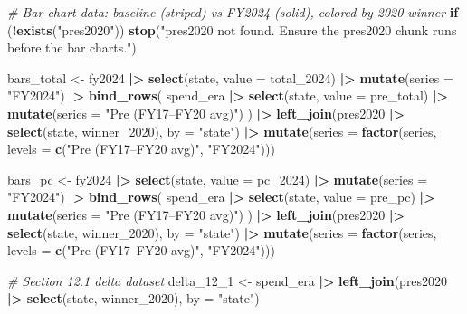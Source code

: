 \documentclass[
  11pt,
]{article}
\newenvironment{Shaded}{\begin{snugshade}}{\end{snugshade}}
\newcommand{\AttributeTok}[1]{\textcolor[rgb]{0.13,0.29,0.53}{#1}}
\newcommand{\CommentTok}[1]{\textcolor[rgb]{0.56,0.35,0.01}{\textit{#1}}}
\newcommand{\ControlFlowTok}[1]{\textcolor[rgb]{0.13,0.29,0.53}{\textbf{#1}}}
\newcommand{\FunctionTok}[1]{\textcolor[rgb]{0.13,0.29,0.53}{\textbf{#1}}}
\newcommand{\NormalTok}[1]{#1}
\newcommand{\OtherTok}[1]{\textcolor[rgb]{0.56,0.35,0.01}{#1}}
\newcommand{\SpecialCharTok}[1]{\textcolor[rgb]{0.81,0.36,0.00}{\textbf{#1}}}
\newcommand{\StringTok}[1]{\textcolor[rgb]{0.31,0.60,0.02}{#1}}
\begin{document}
\begin{Shaded}
\begin{Highlighting}[]
\CommentTok{\# Bar chart data: baseline (striped) vs FY2024 (solid), colored by 2020 winner}
\ControlFlowTok{if}\NormalTok{ (}\SpecialCharTok{!}\FunctionTok{exists}\NormalTok{(}\StringTok{"pres2020"}\NormalTok{)) }\FunctionTok{stop}\NormalTok{(}\StringTok{"pres2020 not found. Ensure the pres2020 chunk runs before the bar charts."}\NormalTok{)}

\NormalTok{bars\_total }\OtherTok{\textless{}{-}}\NormalTok{ fy2024 }\SpecialCharTok{|\textgreater{}}
  \FunctionTok{select}\NormalTok{(state, }\AttributeTok{value =}\NormalTok{ total\_2024) }\SpecialCharTok{|\textgreater{}}
  \FunctionTok{mutate}\NormalTok{(}\AttributeTok{series =} \StringTok{"FY2024"}\NormalTok{) }\SpecialCharTok{|\textgreater{}}
  \FunctionTok{bind\_rows}\NormalTok{(}
\NormalTok{    spend\_era }\SpecialCharTok{|\textgreater{}}
      \FunctionTok{select}\NormalTok{(state, }\AttributeTok{value =}\NormalTok{ pre\_total) }\SpecialCharTok{|\textgreater{}}
      \FunctionTok{mutate}\NormalTok{(}\AttributeTok{series =} \StringTok{"Pre (FY17–FY20 avg)"}\NormalTok{)}
\NormalTok{  ) }\SpecialCharTok{|\textgreater{}}
  \FunctionTok{left\_join}\NormalTok{(pres2020 }\SpecialCharTok{|\textgreater{}} \FunctionTok{select}\NormalTok{(state, winner\_2020), }\AttributeTok{by =} \StringTok{"state"}\NormalTok{) }\SpecialCharTok{|\textgreater{}}
  \FunctionTok{mutate}\NormalTok{(}\AttributeTok{series =} \FunctionTok{factor}\NormalTok{(series, }\AttributeTok{levels =} \FunctionTok{c}\NormalTok{(}\StringTok{"Pre (FY17–FY20 avg)"}\NormalTok{, }\StringTok{"FY2024"}\NormalTok{)))}

\NormalTok{bars\_pc }\OtherTok{\textless{}{-}}\NormalTok{ fy2024 }\SpecialCharTok{|\textgreater{}}
  \FunctionTok{select}\NormalTok{(state, }\AttributeTok{value =}\NormalTok{ pc\_2024) }\SpecialCharTok{|\textgreater{}}
  \FunctionTok{mutate}\NormalTok{(}\AttributeTok{series =} \StringTok{"FY2024"}\NormalTok{) }\SpecialCharTok{|\textgreater{}}
  \FunctionTok{bind\_rows}\NormalTok{(}
\NormalTok{    spend\_era }\SpecialCharTok{|\textgreater{}}
      \FunctionTok{select}\NormalTok{(state, }\AttributeTok{value =}\NormalTok{ pre\_pc) }\SpecialCharTok{|\textgreater{}}
      \FunctionTok{mutate}\NormalTok{(}\AttributeTok{series =} \StringTok{"Pre (FY17–FY20 avg)"}\NormalTok{)}
\NormalTok{  ) }\SpecialCharTok{|\textgreater{}}
  \FunctionTok{left\_join}\NormalTok{(pres2020 }\SpecialCharTok{|\textgreater{}} \FunctionTok{select}\NormalTok{(state, winner\_2020), }\AttributeTok{by =} \StringTok{"state"}\NormalTok{) }\SpecialCharTok{|\textgreater{}}
  \FunctionTok{mutate}\NormalTok{(}\AttributeTok{series =} \FunctionTok{factor}\NormalTok{(series, }\AttributeTok{levels =} \FunctionTok{c}\NormalTok{(}\StringTok{"Pre (FY17–FY20 avg)"}\NormalTok{, }\StringTok{"FY2024"}\NormalTok{)))}

\CommentTok{\# Section 12.1 delta dataset}
\NormalTok{delta\_12\_1 }\OtherTok{\textless{}{-}}\NormalTok{ spend\_era }\SpecialCharTok{|\textgreater{}}
  \FunctionTok{left\_join}\NormalTok{(pres2020 }\SpecialCharTok{|\textgreater{}} \FunctionTok{select}\NormalTok{(state, winner\_2020), }\AttributeTok{by =} \StringTok{"state"}\NormalTok{)}
\end{Highlighting}
\end{Shaded}
\end{document}
